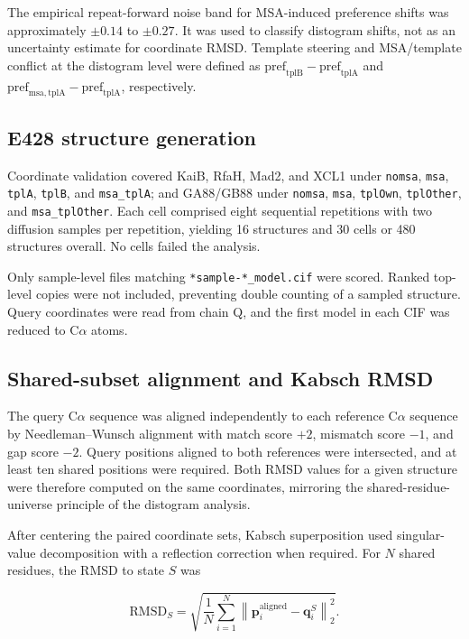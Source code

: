 \documentclass[10pt,a4paper]{article}
\begin{document}
The empirical repeat-forward noise band for MSA-induced preference shifts was approximately $\pm0.14$ to $\pm0.27$. It was used to classify distogram shifts, not as an uncertainty estimate for coordinate RMSD. Template steering and MSA/template conflict at the distogram level were defined as $\mathrm{pref}_{\mathrm{tplB}}-\mathrm{pref}_{\mathrm{tplA}}$ and $\mathrm{pref}_{\mathrm{msa,tplA}}-\mathrm{pref}_{\mathrm{tplA}}$, respectively.

\subsection{E428 structure generation}

Coordinate validation covered KaiB, RfaH, Mad2, and XCL1 under \texttt{nomsa}, \texttt{msa}, \texttt{tplA}, \texttt{tplB}, and \texttt{msa\_tplA}; and GA88/GB88 under \texttt{nomsa}, \texttt{msa}, \texttt{tplOwn}, \texttt{tplOther}, and \texttt{msa\_tplOther}. Each cell comprised eight sequential repetitions with two diffusion samples per repetition, yielding 16 structures and 30 cells or 480 structures overall. No cells failed the analysis.

Only sample-level files matching \texttt{*sample-*\_model.cif} were scored. Ranked top-level copies were not included, preventing double counting of a sampled structure. Query coordinates were read from chain Q, and the first model in each CIF was reduced to C$\alpha$ atoms.

\subsection{Shared-subset alignment and Kabsch RMSD}

The query C$\alpha$ sequence was aligned independently to each reference C$\alpha$ sequence by Needleman--Wunsch alignment with match score $+2$, mismatch score $-1$, and gap score $-2$. Query positions aligned to both references were intersected, and at least ten shared positions were required. Both RMSD values for a given structure were therefore computed on the same coordinates, mirroring the shared-residue-universe principle of the distogram analysis.

After centering the paired coordinate sets, Kabsch superposition used singular-value decomposition with a reflection correction when required. For $N$ shared residues, the RMSD to state $S$ was

\begin{equation}
\mathrm{RMSD}_S=\sqrt{\frac{1}{N}\sum_{i=1}^{N}
\left\lVert\mathbf p_i^{\mathrm{aligned}}-\mathbf q_i^{S}\right\rVert_2^2}.
\end{equation}
\end{document}
